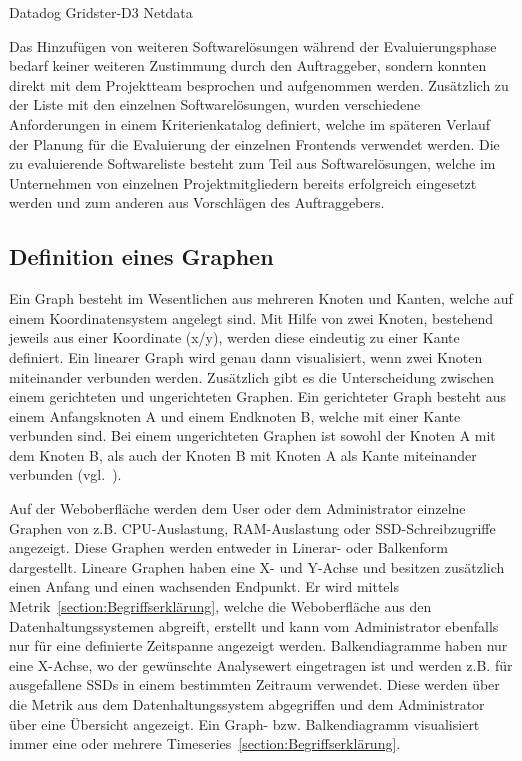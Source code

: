 \begin{outline}
  \1 Datadog
  \1 Gridster-D3
  \1 Netdata
\end{outline}

Das Hinzufügen von weiteren Softwarelösungen während der Evaluierungsphase
bedarf keiner weiteren Zustimmung durch den Auftraggeber, sondern konnten direkt
mit dem Projektteam besprochen und aufgenommen werden. Zusätzlich zu der Liste
mit den einzelnen Softwarelösungen, wurden verschiedene Anforderungen in einem
Kriterienkatalog definiert, welche im späteren Verlauf der Planung für die
Evaluierung der einzelnen Frontends verwendet werden. Die zu evaluierende
Softwareliste besteht zum Teil aus Softwarelösungen, welche im Unternehmen von
einzelnen Projektmitgliedern bereits erfolgreich eingesetzt werden und zum
anderen aus Vorschlägen des Auftraggebers.
\mr%

\subsection{Definition eines Graphen}
\label{definition_eines_graphen}
Ein Graph besteht im Wesentlichen aus mehreren Knoten und Kanten, welche auf
einem Koordinatensystem angelegt sind. Mit Hilfe von zwei Knoten, bestehend
jeweils aus einer Koordinate (x/y), werden diese eindeutig zu einer Kante
definiert. Ein linearer Graph wird genau dann visualisiert, wenn zwei Knoten
miteinander verbunden werden. Zusätzlich gibt es die Unterscheidung zwischen
einem gerichteten und ungerichteten Graphen. Ein gerichteter Graph besteht aus
einem Anfangsknoten A und einem Endknoten B, welche mit einer Kante verbunden
sind. Bei einem ungerichteten Graphen ist sowohl der Knoten A mit dem Knoten B,
als auch der Knoten B mit Knoten A als Kante miteinander
verbunden (vgl.~\cite{kaiser2008c}).

Auf der Weboberfläche werden dem User oder dem Administrator einzelne Graphen
von z.B. CPU-Auslastung, RAM-Auslastung oder SSD-Schreibzugriffe angezeigt.
Diese Graphen werden entweder in Linerar- oder Balkenform dargestellt. Lineare
Graphen haben eine X- und Y-Achse und besitzen zusätzlich einen Anfang und
einen wachsenden Endpunkt. Er wird mittels
Metrik~\ref{section:Begriffserklärung}, welche die Weboberfläche aus den
Datenhaltungssystemen abgreift, erstellt und kann vom Administrator ebenfalls
nur für eine definierte Zeitspanne angezeigt werden. Balkendiagramme haben nur
eine X-Achse, wo der gewünschte Analysewert eingetragen ist und werden z.B. für
ausgefallene SSDs in einem bestimmten Zeitraum verwendet. Diese werden über die
Metrik aus dem Datenhaltungssystem abgegriffen und dem Administrator über eine
Übersicht angezeigt. Ein Graph- bzw. Balkendiagramm visualisiert immer eine
oder mehrere Timeseries~\ref{section:Begriffserklärung}.

